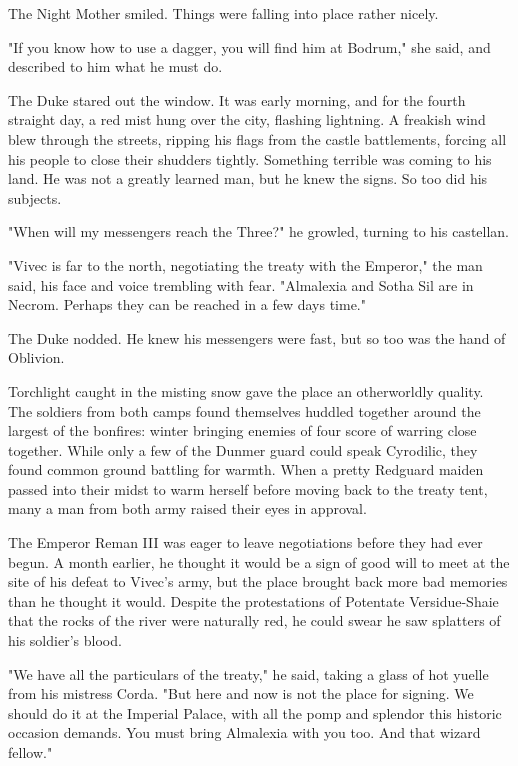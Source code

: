 The Night Mother smiled. Things were falling into place rather nicely.

"If you know how to use a dagger, you will find him at Bodrum," she said, and described to him what he must do.

The Duke stared out the window. It was early morning, and for the fourth straight day, a red mist hung over the city, flashing lightning. A freakish wind blew through the streets, ripping his flags from the castle battlements, forcing all his people to close their shudders tightly. Something terrible was coming to his land. He was not a greatly learned man, but he knew the signs. So too did his subjects.

"When will my messengers reach the Three?" he growled, turning to his castellan.

"Vivec is far to the north, negotiating the treaty with the Emperor," the man said, his face and voice trembling with fear. "Almalexia and Sotha Sil are in Necrom. Perhaps they can be reached in a few days time."

The Duke nodded. He knew his messengers were fast, but so too was the hand of Oblivion.

Torchlight caught in the misting snow gave the place an otherworldly quality. The soldiers from both camps found themselves huddled together around the largest of the bonfires: winter bringing enemies of four score of warring close together. While only a few of the Dunmer guard could speak Cyrodilic, they found common ground battling for warmth. When a pretty Redguard maiden passed into their midst to warm herself before moving back to the treaty tent, many a man from both army raised their eyes in approval.

The Emperor Reman III was eager to leave negotiations before they had ever begun. A month earlier, he thought it would be a sign of good will to meet at the site of his defeat to Vivec's army, but the place brought back more bad memories than he thought it would. Despite the protestations of Potentate Versidue-Shaie that the rocks of the river were naturally red, he could swear he saw splatters of his soldier's blood.

"We have all the particulars of the treaty," he said, taking a glass of hot yuelle from his mistress Corda. "But here and now is not the place for signing. We should do it at the Imperial Palace, with all the pomp and splendor this historic occasion demands. You must bring Almalexia with you too. And that wizard fellow."

